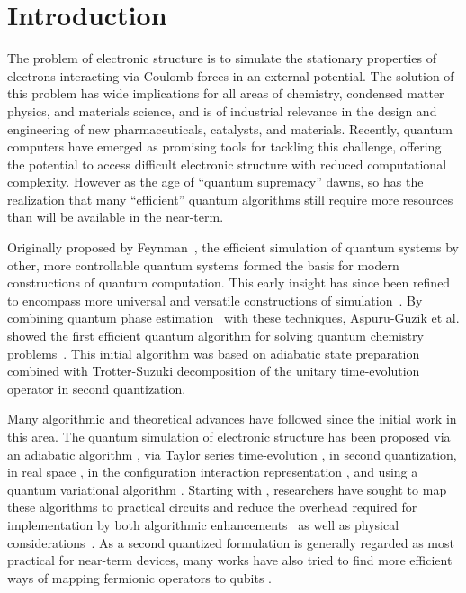 \documentclass[superscriptaddress,aps,pra,nofootinbib,notitlepage,10pt,longbibliography]{revtex4-1}
\begin{document}
\section*{Introduction}

The problem of electronic structure is to simulate the stationary properties of electrons interacting via Coulomb forces in an external potential.  The solution of this problem has wide implications for all areas of chemistry, condensed matter physics, and materials science, and is of industrial relevance in the design and engineering of new pharmaceuticals, catalysts, and materials. Recently, quantum computers have emerged as promising tools for tackling this challenge, offering the potential to access difficult electronic structure with reduced computational complexity. However as the age of ``quantum supremacy'' dawns, so has the realization that many ``efficient'' quantum algorithms still require more resources than will be available in the near-term.

Originally proposed by Feynman~\cite{Feynman1982}, the efficient simulation of quantum systems by other, more controllable quantum systems formed the basis for modern constructions of quantum computation.  This early insight has since been refined to encompass more universal and versatile constructions of simulation~\cite{Lloyd1996,Abrams1997}. By combining quantum phase estimation~\cite{Kitaev1995} with these techniques, Aspuru-Guzik et al. showed the first efficient quantum algorithm for solving quantum chemistry problems~\cite{Aspuru-Guzik2005}. This initial algorithm was based on adiabatic state preparation combined with Trotter-Suzuki decomposition of the unitary time-evolution operator \cite{Trotter1959,Suzuki1993} in second quantization.

Many algorithmic and theoretical advances have followed since the initial work in this area. The quantum simulation of electronic structure has been proposed via an adiabatic algorithm \cite{BabbushAQChem}, via Taylor series time-evolution \cite{BabbushSparse1}, in second quantization, in real space \cite{Kassal2008,Kivlichan2016}, in the configuration interaction representation \cite{Toloui2013,BabbushSparse2}, and using a quantum variational algorithm \cite{Peruzzo2013,McClean2015}. Starting with \cite{Whitfield2010}, researchers have sought to map these algorithms to practical circuits and reduce the overhead required for implementation by both algorithmic enhancements~\cite{Wecker2014,Poulin2014,Hastings2015,Romero2017} as well as physical considerations~\cite{BabbushTrotter,McClean2014}. As a second quantized formulation is generally regarded as most practical for near-term devices, many works have also tried to find more efficient ways of mapping fermionic operators to qubits \cite{Seeley2012,Tranter2015,Whitfield2016,Bravyi2017,Havlicek2017}.
\end{document}
